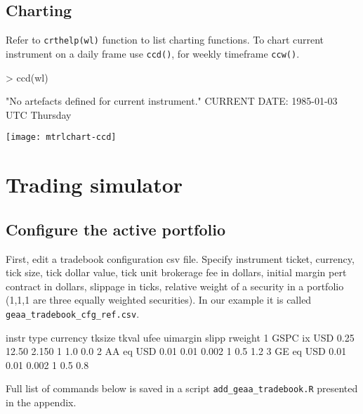 \documentclass{article}
\begin{document}
\subsection{Charting}

\begin{center}
Refer to {\tt crthelp(wl)} function to list charting functions. To chart current instrument on a daily frame use {\tt ccd()}, for weekly timeframe {\tt ccw()}.
\begin{Schunk}
\begin{Sinput}
> ccd(wl)
\end{Sinput}
\begin{Soutput}
[1] "No artefacts defined for current instrument."
CURRENT DATE:  1985-01-03 UTC Thursday 
\end{Soutput}
\end{Schunk}
\texttt{[image: mtrlchart-ccd]}
\end{center}


\section{Trading simulator}
\subsection{Configure the active portfolio}
First, edit a tradebook configuration csv file. Specify instrument ticket, currency, tick size, tick dollar value, tick unit brokerage fee in dollars, initial margin pert contract in dollars, slippage in ticks, relative weight of a security in a portfolio (1,1,1 are  three equally weighted securities).
In our example it is called \texttt{geaa\_tradebook\_cfg\_ref.csv}.
\begin{Schunk}
\begin{Soutput}
  instr type currency tksize tkval  ufee uimargin slipp rweight
1  GSPC   ix      USD   0.25 12.50 2.150        1   1.0     0.0
2    AA   eq      USD   0.01  0.01 0.002        1   0.5     1.2
3    GE   eq      USD   0.01  0.01 0.002        1   0.5     0.8
\end{Soutput}
\end{Schunk}
Full list of commands below is saved in a script \texttt{add\_geaa\_tradebook.R} presented in the appendix.
\end{document}
